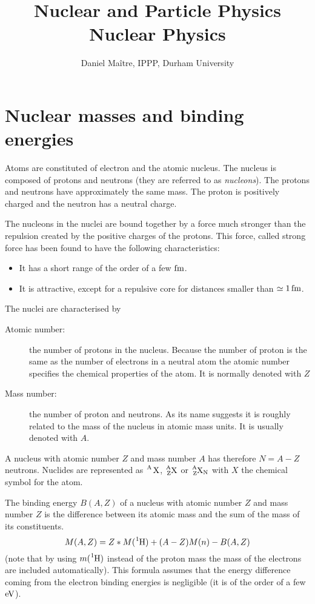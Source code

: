 \documentclass[12pt]{article}
\date{}
\title{\LARGE \bf Nuclear and Particle Physics\\[5mm]Nuclear Physics}
\author{Daniel Ma\^{i}tre, IPPP, Durham University}
\begin{document}
\maketitle
%
%
%
%
%
\section{Nuclear masses and binding energies}
%
%
%
%
%
%
Atoms are constituted of electron and the atomic nucleus. The nucleus is composed of protons and neutrons (they are referred to as \emph{nucleons}). The protons and neutrons have approximately the same mass. The proton is positively charged and the neutron has a neutral charge. 

The nucleons in the nuclei are bound together by a force much stronger than the repulsion created by the positive charges of the protons. This force, called strong force has been found to have the following characteristics: 
\begin{itemize}
\item It has a short range of the order of a few $\rm fm$.
\item It is attractive, except for a repulsive core for distances smaller than $\simeq 1\,\rm fm$. 
\end{itemize}  

The nuclei are characterised by
\begin{description} 
\item[Atomic number:] the number of protons in the nucleus. Because the number of proton is the same as the number of electrons in a neutral atom the atomic number specifies the chemical properties of the atom. It is normally denoted with $Z$   
\item[Mass number:] the number of proton and neutrons. As its name suggests it is roughly related to the mass of the nucleus in atomic mass units. It is usually denoted with $A$.
\end{description}

A nucleus with atomic number $Z$ and mass number $A$ has therefore $N=A-Z$ neutrons. Nuclides are represented as $\ce{^A X}$, $\ce{^{A}_{Z}X}$ or $\ce{^{A}_{Z}X_N}$ with $X$ the chemical symbol for the atom. 

The binding energy $B(A,Z)$ of a nucleus with atomic number $Z$ and mass number $Z$ is the difference between its atomic mass and the sum of the mass of its constituents. 
\[M(A,Z)=Z*M(\ce{^{1}H})+(A-Z)M(n)-B(A,Z)\]
(note that by using $m(\ce{^{1}H})$ instead of the proton mass the mass of the electrons are included automatically). This formula assumes that the energy difference coming from the electron binding energies is negligible (it is of the order of a few $\rm{eV}$). 
\end{document}
